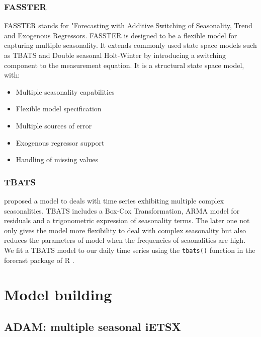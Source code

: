\documentclass[]{elsarticle} %
\providecommand{\tightlist}{%
  \setlength{\itemsep}{0pt}\setlength{\parskip}{0pt}}
\begin{document}
\hypertarget{fasster}{%
\subsubsection{FASSTER}\label{fasster}}

FASSTER \citep{fasster2020} stands for "Forecasting with Additive Switching of Seasonality, Trend and Exogenous Regressors. FASSTER is designed to be a flexible model for capturing multiple seasonality. It extends commonly used state space models such as TBATS and Double seasonal Holt-Winter by introducing a switching component to the measurement equation. It is a structural state space model, with:

\begin{itemize}
\tightlist
\item
  Multiple seasonality capabilities
\item
  Flexible model specification
\item
  Multiple sources of error
\item
  Exogenous regressor support
\item
  Handling of missing values
\end{itemize}

\hypertarget{tbats}{%
\subsubsection{TBATS}\label{tbats}}

\citet{de2011forecasting} proposed a model to deals with time series exhibiting multiple complex seasonalities. TBATS includes a Box-Cox Transformation, ARMA model for residuals and a trigonometric expression of seasonality terms. The later one not only gives the model more flexibility to deal with complex seasonality but also reduces the parameters of model when the frequencies of seaonalities are high. We fit a TBATS model to our daily time series using the \texttt{tbats()} function in the forecast package of R \citep{forecastpackage2020}.

\hypertarget{model}{%
\section{Model building}\label{model}}

\hypertarget{adam-multiple-seasonal-ietsx}{%
\subsection{ADAM: multiple seasonal iETSX}\label{adam-multiple-seasonal-ietsx}}
\end{document}
